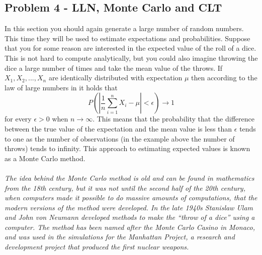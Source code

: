 \documentclass[letterpaper,12pt]{article}
\begin{document}
\subsection*{Problem 4 - LLN, Monte Carlo and CLT}
In this section you should again generate a large number of random numbers. This time they will be used to estimate expectations and probabilities. Suppose that you for some reason are interested in the expected value of the roll of a dice. This is not hard to compute analytically, but you could also imagine throwing the dice a large number of times and take the mean value of the throws. If $X_{1}, X_{2}, ... , X_{n}$ are identically distributed with expectation $\mu$ then according to the law of large numbers in it holds that
\begin{equation*}
    P\left( \left| \frac{1}{n} \sum_{i=1}^{n} X_{i} - \mu \right | < \epsilon \right) \rightarrow 1
\end{equation*}
for every $\epsilon > 0$ when $n \rightarrow \infty$. This means that the probability that the difference between the true value of the expectation and the mean value is less than $\epsilon$ tends to one as the number of observations (in the example above the number of throws) tends to infinity. This approach to estimating expected values is known as a Monte Carlo method.\\
\\
\textit{The idea behind the Monte Carlo method is old and can be found in mathematics from the 18th century, but it was not until the second half of the 20th century, when computers made it possible to do massive amounts of computations, that the modern versions of the method were developed. In the late 1940s Stanislaw Ulam and John von Neumann developed methods to make the “throw of a dice” using a computer. The method has been named after the Monte Carlo Casino in Monaco, and was used in the simulations for the Manhattan Project, a research and development project that produced the first nuclear weapons.}
\end{document}
